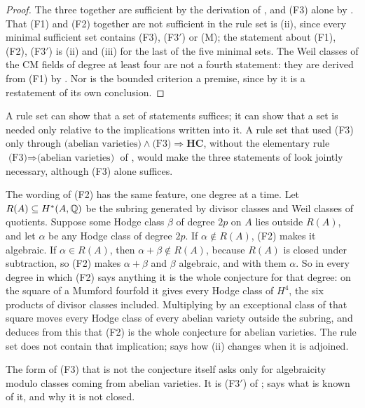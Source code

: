 \begin{proof}
The three together are sufficient by the derivation of ,
and (F3) alone by . That (F1) and (F2) together are not
sufficient in the rule set is (ii), since every minimal
sufficient set contains (F3), \textup{(F3$'$)} or \textup{(M)}; the
statement about (F1), (F2), \textup{(F3$'$)} is (ii) and
(iii) for the last of the five minimal sets. The Weil classes of the CM
fields of degree at least four are not a fourth statement: they are derived
from (F1) by . Nor is the bounded criterion a
premise, since by  it is a restatement of its own
conclusion.
\end{proof}

\begin{remark}
\label{rem:f3collapse}
A rule set can show that a set of statements suffices; it can show that a set
is needed only relative to the implications written into it. A rule set that
used (F3) only through $\text{(abelian varieties)}\wedge
\text{(F3)}\Rightarrow\mathbf{HC}$, without the elementary rule
$\text{(F3)}\Rightarrow\text{(abelian varieties)}$ of ,
would make the three statements of  look jointly
necessary, although (F3) alone suffices.

The wording of (F2) has the same feature, one degree at a time. Let
$R(A)\subseteq H^{*}(A,\mathbb{Q})$ be the subring generated by divisor classes and
Weil classes of quotients. Suppose some Hodge class $\beta$ of degree $2p$ on
$A$ lies outside $R(A)$, and let $\alpha$ be any Hodge class of degree $2p$.
If $\alpha\notin R(A)$, (F2) makes it algebraic. If $\alpha\in R(A)$, then
$\alpha+\beta\notin R(A)$, because $R(A)$ is closed under subtraction, so
(F2) makes $\alpha+\beta$ and $\beta$ algebraic, and with them $\alpha$.
So in every degree in which (F2) says anything it is the whole conjecture for
that degree: on the square of a Mumford fourfold it gives every Hodge class of
$H^{4}$, the six products of divisor classes included. Multiplying by an
exceptional class of that square moves every Hodge class of every abelian
variety outside the subring, and  deduces from this that
(F2) is the whole conjecture for abelian varieties. The rule set does not
contain that implication;  says how (ii)
changes when it is adjoined.

The form of (F3) that is not the conjecture itself asks only for
algebraicity modulo classes coming from abelian varieties. It is
\textup{(F3$'$)} of ;  says what is
known of it, and  why it is not closed.
\end{remark}

